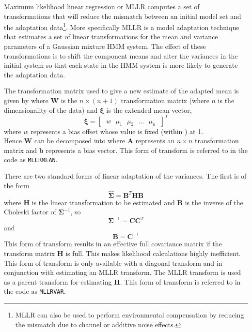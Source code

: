 
Maximum likelihood linear regression or MLLR
computes a set of transformations that will reduce the mismatch
between an initial model set and the adaptation data\footnote{
MLLR can also be used to perform environmental compensation by
reducing the mismatch due to channel or additive noise effects.}.
More specifically MLLR is a model adaptation technique
that estimates a set of linear transformations for the mean and
variance parameters of a Gaussian mixture HMM system. 
The effect of these transformations is to shift the
component means and alter the variances in the initial system 
so that each state in the HMM system is more likely to generate the 
adaptation data.

The transformation matrix used to give a new estimate of the adapted mean is
given by
where $\bm{W}$ is the $n \times \left( n + 1 \right)$
transformation matrix (where $n$ is the dimensionality of the data)
and $\bm{\xi}$ is the extended mean vector,
\[
        \bm{\xi} = \left[\mbox{ }w\mbox{ }\mu_1\mbox{ }\mu_2\mbox{ }\dots\mbox{ }\mu_n\mbox{ }\right]^T
\]
where $w$ represents a bias offset whose value is fixed (within \HTK) at 1.\\
Hence $\bm{W}$ can be decomposed into
where $\bm{A}$ represents an $n \times n$
transformation matrix and $\bm{b}$ represents a bias vector. This
form of transform is referred to in the code as {\tt MLLRMEAN}.


There are two standard forms of linear adaptation of the variances. The first
is of the form
\[
        \hat{\bm{\Sigma}} = \bm{B}^T\bm{H}\bm{B}
\]
where $\bm{H}$ is the linear transformation to be estimated and
$\bm{B}$ is the inverse of the Choleski factor of $\bm{\Sigma}^{-1}$,
so
\[ 
        \bm{\Sigma}^{-1} = \bm{C}\bm{C}^T
\]
and
\[
        \bm{B}= \bm{C}^{-1}
\]
This form of transform results in an effective full covariance matrix if
the transform matrix $\bm{H}$ is full. This makes likelihood calculations
highly inefficient. This form of transform is only available with a 
diagonal transform and in conjunction with estimating an MLLR transform. The
MLLR transform is used as a parent transform for estimating $\bm{H}$.
This form of transform is referred to in the code as {\tt MLLRVAR}.

